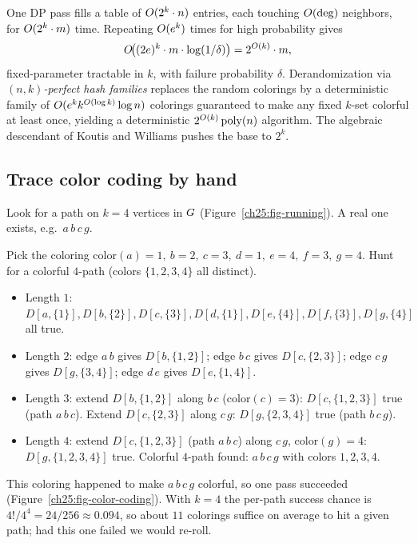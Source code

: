 \begin{complexitybox}
One DP pass fills a table of $O(2^k\cdot n)$ entries, each touching $O(\deg)$ neighbors, for $O(2^k\cdot m)$ time. Repeating $O(e^k)$ times for high probability gives
\[
  O\!\big((2e)^k\cdot m\cdot \log(1/\delta)\big) = 2^{O(k)}\cdot m,
\]
fixed-parameter tractable in $k$, with failure probability $\delta$. Derandomization via \emph{$(n,k)$-perfect hash families} replaces the random colorings by a deterministic family of $O(e^k k^{O(\log k)}\log n)$ colorings guaranteed to make any fixed $k$-set colorful at least once, yielding a deterministic $2^{O(k)}\operatorname{poly}(n)$ algorithm. The algebraic descendant of Koutis and Williams pushes the base to $2^k$.
\end{complexitybox}

\subsection{Trace color coding by hand}

Look for a path on $k=4$ vertices in $G$ (Figure~\ref{ch25:fig-running}). A real one exists, e.g.\ $a\,b\,c\,g$.

\begin{labbox}
Pick the coloring $\mathrm{color}(a)=1,\ b=2,\ c=3,\ d=1,\ e=4,\ f=3,\ g=4$. Hunt for a colorful $4$-path (colors $\{1,2,3,4\}$ all distinct).
\begin{itemize}
  \item Length $1$: $D[a,\{1\}],D[b,\{2\}],D[c,\{3\}],D[d,\{1\}],D[e,\{4\}],D[f,\{3\}],D[g,\{4\}]$ all true.
  \item Length $2$: edge $a\,b$ gives $D[b,\{1,2\}]$; edge $b\,c$ gives $D[c,\{2,3\}]$; edge $c\,g$ gives $D[g,\{3,4\}]$; edge $d\,e$ gives $D[e,\{1,4\}]$.
  \item Length $3$: extend $D[b,\{1,2\}]$ along $b\,c$ ($\mathrm{color}(c)=3$): $D[c,\{1,2,3\}]$ true (path $a\,b\,c$). Extend $D[c,\{2,3\}]$ along $c\,g$: $D[g,\{2,3,4\}]$ true (path $b\,c\,g$).
  \item Length $4$: extend $D[c,\{1,2,3\}]$ (path $a\,b\,c$) along $c\,g$, $\mathrm{color}(g)=4$: $D[g,\{1,2,3,4\}]$ true. Colorful $4$-path found: $a\,b\,c\,g$ with colors $1,2,3,4$.
\end{itemize}
This coloring happened to make $a\,b\,c\,g$ colorful, so one pass succeeded (Figure~\ref{ch25:fig-color-coding}). With $k=4$ the per-path success chance is $4!/4^4 = 24/256 \approx 0.094$, so about $11$ colorings suffice on average to hit a given path; had this one failed we would re-roll.
\end{labbox}


